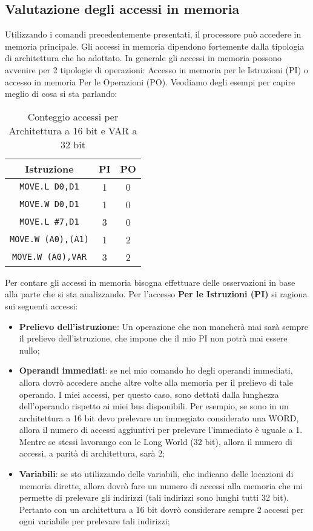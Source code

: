 \subsection{Valutazione degli accessi in memoria}
Utilizzando i comandi precedentemente presentati, il processore può accedere in memoria principale. Gli accessi in memoria dipendono fortemente dalla tipologia di architettura che ho adottato. In generale gli accessi in memoria possono avvenire per 2 tipologie di operazioni: Accesso in memoria per le Istruzioni (PI) o accesso in memoria Per le Operazioni (PO).
Veodiamo degli esempi per capire meglio di cosa si sta parlando:
\begin{table}[h]
    \centering
    \begin{tabular}{|c|c|c|}
        \hline
        \textbf{Istruzione} & \textbf{PI} & \textbf{PO} \\
        \hline
        \lstinline|MOVE.L D0,D1| & 1 & 0 \\
        \lstinline|MOVE.W D0,D1| & 1 & 0 \\
        \lstinline|MOVE.L #7,D1| & 3 & 0 \\
        \lstinline|MOVE.W (A0),(A1)| & 1 & 2 \\
        \lstinline|MOVE.W (A0),VAR| & 3 & 2 \\
        \hline
    \end{tabular}
    \caption{Conteggio accessi per Architettura a 16 bit e VAR a 32 bit}
    \label{tab:esempio}
\end{table}

Per contare gli accessi in memoria bisogna effettuare delle osservazioni in base alla parte che si sta analizzando.
Per l'accesso \textbf{Per le Istruzioni (PI)} si ragiona sui seguenti accessi:
\begin{itemize}
    \item \textbf{Prelievo dell'istruzione}: Un operazione che non mancherà mai sarà sempre il prelievo dell'istruzione, che impone che il mio PI non potrà mai essere nullo;
    \item \textbf{Operandi immediati}: se nel mio comando ho degli operandi immediati, allora dovrò accedere anche altre volte alla memoria per il prelievo di tale operando. I miei accessi, per questo caso, sono dettati dalla lunghezza dell'operando rispetto ai miei bus disponibili. Per esempio, se sono in un architettura a 16 bit devo prelevare un immegiato considerato una WORD, allora il numero di accessi aggiuntivi per prelevare l'immediato è uguale a 1. Mentre se stessi lavorango con le Long World (32 bit), allora il numero di accessi, a parità di architettura, sarà 2;
    \item \textbf{Variabili}: se sto utilizzando delle variabili, che indicano delle locazioni di memoria dirette, allora dovrò fare un numero di accessi alla memoria che mi permette di prelevare gli indirizzi (tali indirizzi sono lunghi tutti 32 bit). Pertanto con un architettura a 16 bit dovrò considerare sempre 2 accessi per ogni variabile per prelevare tali indirizzi;
\end{itemize}

